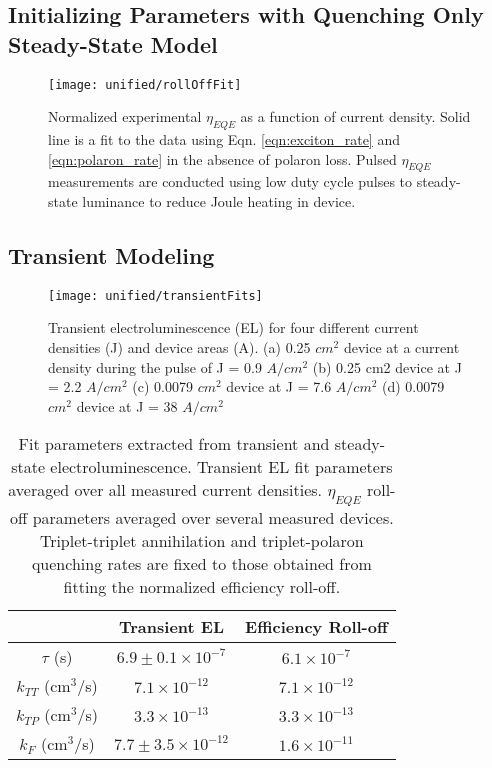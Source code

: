 \documentclass[../thesis.tex]{subfiles}
\begin{document}
\subsection{Initializing Parameters with Quenching Only Steady-State Model}
\begin{wrapfigure}{r}{0.5\textwidth}
\texttt{[image: unified/rollOffFit]}
\caption{Normalized experimental $\eta_{EQE}$ as a function of current density.  Solid line is a fit to the data using Eqn. \ref{eqn:exciton_rate} and \ref{eqn:polaron_rate} in the absence of polaron loss.  Pulsed $\eta_{EQE}$ measurements are conducted using low duty cycle pulses to steady-state luminance to reduce Joule heating in device.}
\label{fig:rollOffFit}
\end{wrapfigure}
\subsection{Transient Modeling}
\begin{wrapfigure}{r}{0.5\textwidth}
\centering
\texttt{[image: unified/transientFits]}
\caption{Transient electroluminescence (EL) for four different current densities (J) and device areas (A). (a) 0.25 $cm^2$ device at a current density during the pulse of J = 0.9 $A/cm^2$ (b) 0.25 cm2
device at J = 2.2 $A/cm^2$ (c) 0.0079 $cm^2$ device at J = 7.6 $A/cm^2$ (d) 0.0079 $cm^2$ device at J = 38 $A/cm^2$}
\label{fig:transientFits}
\end{wrapfigure}

\begin{table}[h]
\centering
\begin{tabular}{c|c|c}
& Transient EL & Efficiency Roll-off \\
\hline
$\tau$ (s) & $6.9\pm 0.1 \times 10^{-7}$ & $6.1 \times 10^{-7}$ \\
$k_{TT}$ (cm$^3$/s) & $7.1\times 10^{-12}$ &$7.1\times 10^{-12}$ \\
$k_{TP}$ (cm$^3$/s) & $3.3\times 10^{-13}$ &$3.3\times 10^{-13}$ \\
$k_{F}$ (cm$^3$/s) & $7.7\pm3.5\times 10^{-12}$ &$1.6\times 10^{-11}$ \\
\end{tabular}
\caption{Fit parameters extracted from transient and steady-state electroluminescence.  Transient EL fit parameters averaged over all measured current densities.  $\eta_{EQE}$ roll-off parameters averaged over several measured devices.  Triplet-triplet annihilation and triplet-polaron quenching rates are fixed to those obtained from fitting the normalized efficiency roll-off.}
\label{tab:fit_parameters}
\end{table}
\end{document}
